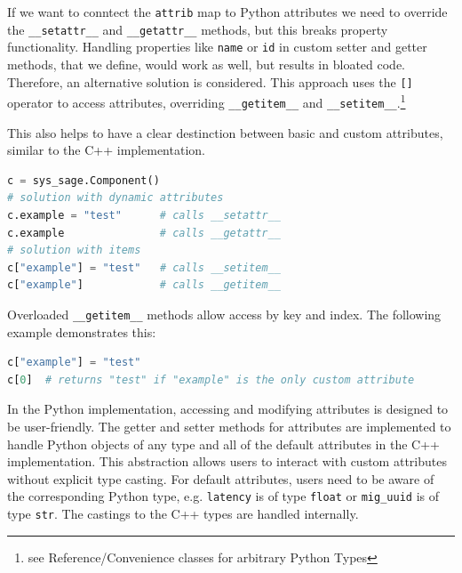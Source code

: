 If we want to conntect the \verb|attrib| map to Python attributes we need to override the \verb|__setattr__| and \verb|__getattr__| methods, but this breaks property functionality. Handling properties like \verb|name| or \verb|id| in custom setter and getter methods, that we define, would work as well, but results in bloated code. Therefore, an alternative solution is considered. This approach uses the \verb|[]| operator to access attributes, overriding \verb|__getitem__| and \verb|__setitem__|.\cite{pybind11-docu}\footnote{see Reference/Convenience classes for arbitrary Python Types}\cite{python-getitem}

This also helps to have a clear destinction between basic and custom attributes, similar to the C++ implementation.

\begin{lstlisting}[language=Python, xleftmargin=4em, frame = single]
c = sys_sage.Component()
# solution with dynamic attributes
c.example = "test"      # calls __setattr__
c.example               # calls __getattr__
# solution with items
c["example"] = "test"   # calls __setitem__
c["example"]            # calls __getitem__
\end{lstlisting}




Overloaded \verb|__getitem__| methods allow access by key and index. The following example demonstrates this:

\begin{lstlisting}[language=Python, xleftmargin=4em, frame = single]
c["example"] = "test"
c[0]  # returns "test" if "example" is the only custom attribute
\end{lstlisting}
In the Python implementation, accessing and modifying attributes is designed to be user-friendly. The getter and setter methods for attributes are implemented to handle Python objects of any type and all of the default attributes in the C++ implementation. This abstraction allows users to interact with custom attributes without explicit type casting. For default attributes, users need to be aware of the corresponding Python type, e.g. \verb|latency| is of type \verb|float| or \verb|mig_uuid| is of type \verb|str|. The castings to the C++ types are handled internally.

